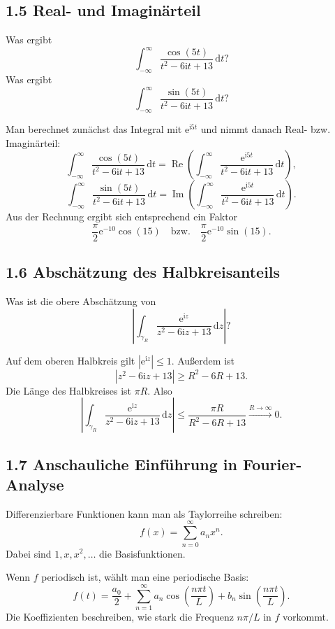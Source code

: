 \documentclass[11pt,a4paper]{article}
\newcommand{\ii}{\mathrm i}
\newcommand{\ee}{\mathrm e}
\newcommand{\dd}{\,\mathrm d}
\newcommand{\Ree}{\operatorname{Re}}
\newcommand{\Imm}{\operatorname{Im}}
\begin{document}
\subsection{1.5 Real- und Imaginärteil}
\begin{fragebox}
Was ergibt
\[
\int_{-\infty}^{\infty}\frac{\cos(5t)}{t^2-6\ii t+13}\dd t?
\]
Was ergibt
\[
\int_{-\infty}^{\infty}\frac{\sin(5t)}{t^2-6\ii t+13}\dd t?
\]
\end{fragebox}
\begin{antwortbox}
Man berechnet zunächst das Integral mit $\ee^{\ii 5t}$ und nimmt danach Real- bzw. Imaginärteil:
\[
\int_{-\infty}^{\infty}\frac{\cos(5t)}{t^2-6\ii t+13}\dd t
=\Ree\left(\int_{-\infty}^{\infty}\frac{\ee^{\ii5t}}{t^2-6\ii t+13}\dd t\right),
\]
\[
\int_{-\infty}^{\infty}\frac{\sin(5t)}{t^2-6\ii t+13}\dd t
=\Imm\left(\int_{-\infty}^{\infty}\frac{\ee^{\ii5t}}{t^2-6\ii t+13}\dd t\right).
\]
Aus der Rechnung ergibt sich entsprechend ein Faktor
\[
\frac{\pi}{2}\ee^{-10}\cos(15)
\quad\text{bzw.}\quad
\frac{\pi}{2}\ee^{-10}\sin(15).
\]
\end{antwortbox}

\subsection{1.6 Abschätzung des Halbkreisanteils}
\begin{fragebox}
Was ist die obere Abschätzung von
\[
\left|\int_{\gamma_R}\frac{\ee^{\ii z}}{z^2-6\ii z+13}\dd z\right|?
\]
\end{fragebox}
\begin{antwortbox}
Auf dem oberen Halbkreis gilt $|\ee^{\ii z}|\le1$. Außerdem ist
\[
|z^2-6\ii z+13|\ge R^2-6R+13.
\]
Die Länge des Halbkreises ist $\pi R$. Also
\[
\left|\int_{\gamma_R}\frac{\ee^{\ii z}}{z^2-6\ii z+13}\dd z\right|
\le \frac{\pi R}{R^2-6R+13}\xrightarrow{R\to\infty}0.
\]
\end{antwortbox}

\subsection{1.7 Anschauliche Einführung in Fourier-Analyse}
Differenzierbare Funktionen kann man als Taylorreihe schreiben:
\[
f(x)=\sum_{n=0}^{\infty}a_nx^n.
\]
Dabei sind $1,x,x^2,\ldots$ die Basisfunktionen.

Wenn $f$ periodisch ist, wählt man eine periodische Basis:
\[
f(t)=\frac{a_0}{2}+\sum_{n=1}^{\infty}a_n\cos\left(\frac{n\pi t}{L}\right)+b_n\sin\left(\frac{n\pi t}{L}\right).
\]
Die Koeffizienten beschreiben, wie stark die Frequenz $n\pi/L$ in $f$ vorkommt.
\end{document}
